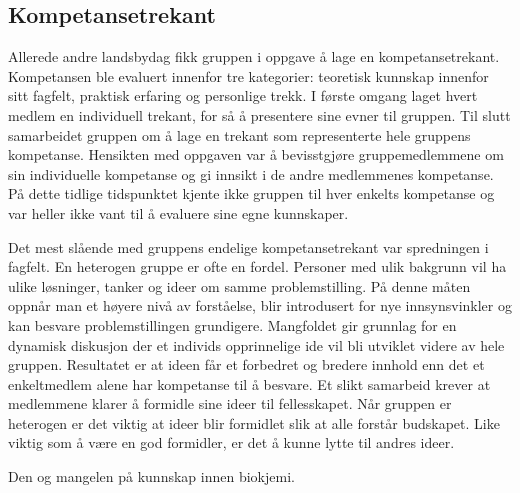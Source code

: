 \subsection{Kompetansetrekant}

Allerede andre landsbydag fikk gruppen i oppgave å lage en kompetansetrekant. Kompetansen ble evaluert innenfor tre kategorier: teoretisk kunnskap innenfor sitt fagfelt, praktisk erfaring og personlige trekk. 
I første omgang laget hvert medlem en individuell trekant, for så å presentere sine evner til gruppen. 
Til slutt samarbeidet gruppen om å lage en trekant som representerte hele gruppens kompetanse.
Hensikten med oppgaven var å bevisstgjøre gruppemedlemmene om sin individuelle kompetanse og gi innsikt i de andre medlemmenes kompetanse. 
På dette tidlige tidspunktet kjente ikke gruppen til hver enkelts kompetanse og var heller ikke vant til å evaluere sine egne kunnskaper.

Det mest slående med gruppens endelige kompetansetrekant var spredningen i fagfelt.
En heterogen gruppe er ofte en fordel.
Personer med ulik bakgrunn vil ha ulike løsninger, tanker og ideer om samme problemstilling. 
På denne måten oppnår man et høyere nivå av forståelse, blir introdusert for nye innsynsvinkler og kan besvare problemstillingen grundigere.
Mangfoldet gir grunnlag for en dynamisk diskusjon der et individs opprinnelige ide vil bli utviklet videre av hele gruppen.
Resultatet er at ideen får et forbedret og bredere innhold enn det et enkeltmedlem alene har kompetanse til å besvare.
Et slikt samarbeid krever at medlemmene klarer å formidle sine ideer til fellesskapet.
Når gruppen er heterogen er det viktig at ideer blir formidlet slik at alle forstår budskapet.
Like viktig som å være en god formidler, er det å kunne lytte til andres ideer. 

Den og mangelen på kunnskap innen biokjemi.